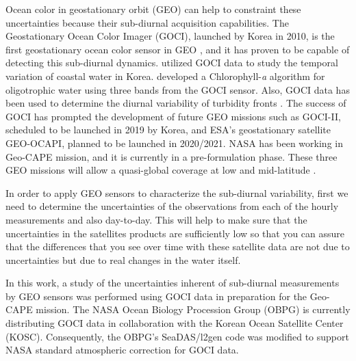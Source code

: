 \documentclass[onecolumn,3p,letterpaper,11pt]{elsarticle}
\begin{document}
Ocean color in geostationary orbit (GEO) can help to constraint these uncertainties because their sub-diurnal acquisition capabilities.
The Geostationary Ocean Color Imager (GOCI), launched by Korea in 2010, is the first geostationary ocean color sensor in GEO \citep{Ryu2012}, and it has proven to be capable of detecting this sub-diurnal dynamics.
%
\citet{Ryu2011} utilized GOCI data to study the temporal variation of coastal water in Korea. 
\citet{He2013} developed a Chlorophyll-{\it a} algorithm for oligotrophic water using three bands from the GOCI sensor. 
Also, GOCI data has been used to determine the diurnal variability of turbidity fronts \citep{Hu2016}.
%
The success of GOCI has prompted the development of future GEO missions such as GOCI-II, scheduled to be launched in 2019 by Korea, and ESA's geostationary satellite GEO-OCAPI, planned to be launched in 2020/2021.
NASA has been working in Geo-CAPE mission, and it is currently in a pre-formulation phase. 
These three GEO missions will allow a quasi-global coverage at low and mid-latitude \citep{Ruddick2014}.




In order to apply GEO sensors to characterize the sub-diurnal variability, first we need to determine the uncertainties of the observations from each of the hourly measurements and also day-to-day.
This will help to make sure that the uncertainties in the satellites products are sufficiently low so that you can assure that the differences that you see over time with these satellite data are not due to uncertainties but due to real changes in the water itself.

In this work, a study of the uncertainties inherent of sub-diurnal measurements by GEO sensors was performed using GOCI data in preparation for the Geo-CAPE mission.
The NASA Ocean Biology Procession Group (OBPG) is currently distributing GOCI data in collaboration with the Korean Ocean Satellite Center (KOSC).
Consequently, the OBPG's SeaDAS/l2gen code was modified to support NASA standard atmospheric correction for GOCI data.
\end{document}
